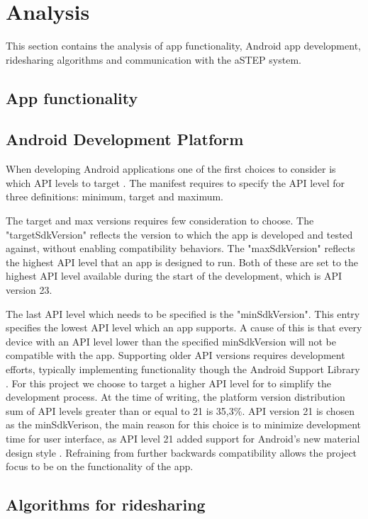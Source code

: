 \section{Analysis}
This section contains the analysis of app functionality, Android app development, ridesharing algorithms and communication with the aSTEP system.

\subsection{App functionality}




\subsection{Android Development Platform}
When developing Android applications one of the first choices to consider is which API levels to target \cite{usesSDK}.
The manifest requires to specify the API level  for three definitions: minimum, target and maximum. 

The target and max versions requires few consideration to choose.
The "targetSdkVersion" reflects the version to which the app is developed and tested against, without enabling compatibility behaviors.
The "maxSdkVersion" reflects the highest API level that an app is designed to run.
Both of these are set to the highest API level available during the start of the development, which is API version 23.

The last API level which needs to be specified is the "minSdkVersion".
This entry specifies the lowest API level which an app supports.
A cause of this is that every device with an API level lower than the specified minSdkVersion will not be compatible with the app.
Supporting older API versions requires development efforts, typically implementing functionality though the Android Support Library \cite{androidSL}.
For this project we choose to target a higher API level for to simplify the development process.
At the time of writing, the platform version distribution sum of API levels greater than or equal to 21 is 35,3\%.
API version 21 is chosen as the minSdkVerison, the main reason for this choice is to minimize development time for user interface, as API level 21 added support for Android's new material design style \cite{android5API}. Refraining from further backwards compatibility allows the project focus to be on the functionality of the app. 



\subsection{Algorithms for ridesharing}




